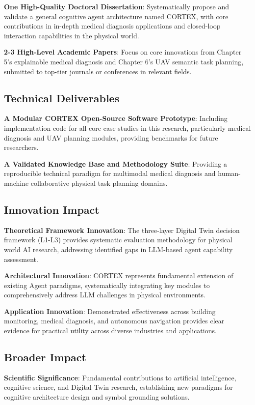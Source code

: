 \textbf{One High-Quality Doctoral Dissertation}: Systematically propose and validate a general cognitive agent architecture named CORTEX, with core contributions in in-depth medical diagnosis applications and closed-loop interaction capabilities in the physical world.

\textbf{2-3 High-Level Academic Papers}: Focus on core innovations from Chapter 5's explainable medical diagnosis and Chapter 6's UAV semantic task planning, submitted to top-tier journals or conferences in relevant fields.

\subsection{Technical Deliverables}

\textbf{A Modular CORTEX Open-Source Software Prototype}: Including implementation code for all core case studies in this research, particularly medical diagnosis and UAV planning modules, providing benchmarks for future researchers.

\textbf{A Validated Knowledge Base and Methodology Suite}: Providing a reproducible technical paradigm for multimodal medical diagnosis and human-machine collaborative physical task planning domains.

\subsection{Innovation Impact}

\textbf{Theoretical Framework Innovation}: The three-layer Digital Twin decision framework (L1-L3) provides systematic evaluation methodology for physical world AI research, addressing identified gaps in LLM-based agent capability assessment.

\textbf{Architectural Innovation}: CORTEX represents fundamental extension of existing Agent paradigms, systematically integrating key modules to comprehensively address LLM challenges in physical environments.

\textbf{Application Innovation}: Demonstrated effectiveness across building monitoring, medical diagnosis, and autonomous navigation provides clear evidence for practical utility across diverse industries and applications.

\subsection{Broader Impact}

\textbf{Scientific Significance}: Fundamental contributions to artificial intelligence, cognitive science, and Digital Twin research, establishing new paradigms for cognitive architecture design and symbol grounding solutions.

